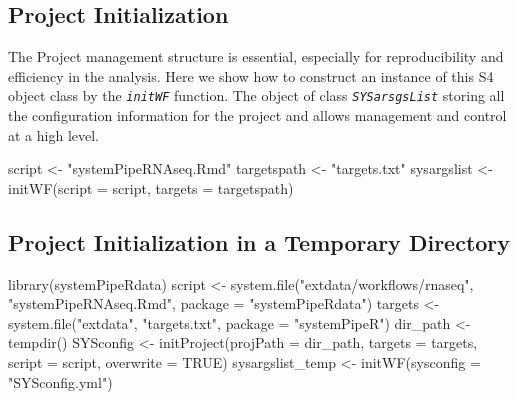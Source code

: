 \documentclass[14pt,]{article}
\newcommand{\hlstr}[1]{\textcolor[rgb]{0.251,0.627,0.251}{#1}}%
\newcommand{\hlstd}[1]{\textcolor[rgb]{0.251,0.251,0.251}{#1}}%
\newcommand{\hlkwc}[1]{\textcolor[rgb]{0.251,0.251,0.251}{#1}}%
\newcommand{\hlkwd}[1]{\textcolor[rgb]{0.878,0.439,0.125}{#1}}%
\newenvironment{Shaded}{\begin{myshaded}}{\end{myshaded}}
\newcommand{\KeywordTok}[1]{\hlkwd{#1}}
\newcommand{\DataTypeTok}[1]{\hlkwc{#1}}
\newcommand{\StringTok}[1]{\hlstr{#1}}
\newcommand{\OtherTok}[1]{{#1}}
\newcommand{\NormalTok}[1]{\hlstd{#1}}
\begin{document}
\hypertarget{project-initialization}{%
\subsection{Project Initialization}\label{project-initialization}}

The Project management structure is essential, especially for reproducibility and efficiency in the analysis. Here we show how to construct an instance of this S4 object class by the \emph{\texttt{initWF}} function. The object of class \emph{\texttt{SYSarsgsList}} storing all the configuration information for the project and allows management and control at a high level.

\begin{Shaded}
\begin{Highlighting}[]
\NormalTok{script <-}\StringTok{ "systemPipeRNAseq.Rmd"}
\NormalTok{targetspath <-}\StringTok{ "targets.txt"}
\NormalTok{sysargslist <-}\StringTok{ }\KeywordTok{initWF}\NormalTok{(}\DataTypeTok{script =}\NormalTok{ script, }\DataTypeTok{targets =}\NormalTok{ targetspath)}
\end{Highlighting}
\end{Shaded}

\hypertarget{project-initialization-in-a-temporary-directory}{%
\subsection{Project Initialization in a Temporary Directory}\label{project-initialization-in-a-temporary-directory}}

\begin{Shaded}
\begin{Highlighting}[]
\KeywordTok{library}\NormalTok{(systemPipeRdata)}
\NormalTok{script <-}\StringTok{ }\KeywordTok{system.file}\NormalTok{(}\StringTok{"extdata/workflows/rnaseq"}\NormalTok{, }\StringTok{"systemPipeRNAseq.Rmd"}\NormalTok{, }\DataTypeTok{package =} \StringTok{"systemPipeRdata"}\NormalTok{)}
\NormalTok{targets <-}\StringTok{ }\KeywordTok{system.file}\NormalTok{(}\StringTok{"extdata"}\NormalTok{, }\StringTok{"targets.txt"}\NormalTok{, }\DataTypeTok{package =} \StringTok{"systemPipeR"}\NormalTok{)}
\NormalTok{dir_path <-}\StringTok{ }\KeywordTok{tempdir}\NormalTok{()}
\NormalTok{SYSconfig <-}\StringTok{ }\KeywordTok{initProject}\NormalTok{(}\DataTypeTok{projPath =}\NormalTok{ dir_path, }\DataTypeTok{targets =}\NormalTok{ targets, }\DataTypeTok{script =}\NormalTok{ script, }
    \DataTypeTok{overwrite =} \OtherTok{TRUE}\NormalTok{)}
\NormalTok{sysargslist_temp <-}\StringTok{ }\KeywordTok{initWF}\NormalTok{(}\DataTypeTok{sysconfig =} \StringTok{"SYSconfig.yml"}\NormalTok{)}
\end{Highlighting}
\end{Shaded}
\end{document}
